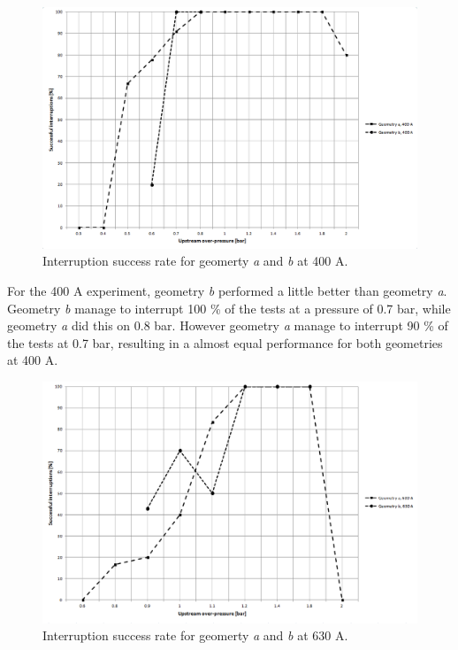 \documentclass[10pt,a4paper,twoside]{article}
\begin{document}
\begin{figure}[H]
\centering
\includegraphics[scale=0.5]{Bilder/Results/successRate400A.png}
\caption{Interruption success rate for geomerty \textit{a} and \textit{b} at 400 A.} \label{fig:successRate400A}
\end{figure}

For the 400 A experiment, geometry \textit{b} performed a little better than geometry \textit{a}. Geometry \textit{b} manage to interrupt 100 \% of the tests at a pressure of 0.7 bar, while geometry \textit{a} did this on 0.8 bar. However geometry \textit{a} manage to interrupt 90 \% of the tests at 0.7 bar, resulting in a almost equal performance for both geometries at 400 A.

\begin{figure}[H]
\centering
\includegraphics[scale=0.5]{Bilder/Results/successRate630A.png}
\caption{Interruption success rate for geomerty \textit{a} and \textit{b} at 630 A.} \label{fig:successRate630A}
\end{figure}
\end{document}
